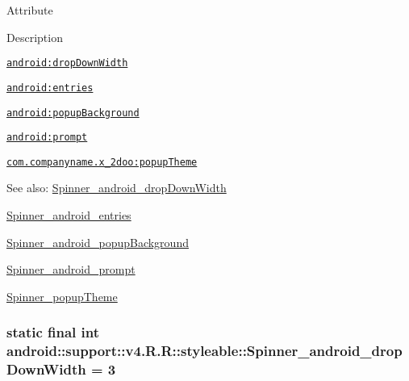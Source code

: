 Attribute

Description 

{\tt \hyperlink{classandroid_1_1support_1_1v4_1_1_r_1_1styleable_cbe49385f464cc4ae61e3598c9e2cfdc}{android:dropDownWidth}}

{\tt \hyperlink{classandroid_1_1support_1_1v4_1_1_r_1_1styleable_e1857fbb0172a2ba1e3b518c6dacac0d}{android:entries}}

{\tt \hyperlink{classandroid_1_1support_1_1v4_1_1_r_1_1styleable_101054d5ddcc269aa79631d35504d107}{android:popupBackground}}

{\tt \hyperlink{classandroid_1_1support_1_1v4_1_1_r_1_1styleable_66514c7282401aadd8fcf1b7cf06da7a}{android:prompt}}

{\tt \hyperlink{classandroid_1_1support_1_1v4_1_1_r_1_1styleable_b914ffabdea8381281dd34343fb1a5f1}{com.companyname.x\_\-2doo:popupTheme}}

\begin{Desc}
\item[See also:]\hyperlink{classandroid_1_1support_1_1v4_1_1_r_1_1styleable_cbe49385f464cc4ae61e3598c9e2cfdc}{Spinner\_\-android\_\-dropDownWidth} 

\hyperlink{classandroid_1_1support_1_1v4_1_1_r_1_1styleable_e1857fbb0172a2ba1e3b518c6dacac0d}{Spinner\_\-android\_\-entries} 

\hyperlink{classandroid_1_1support_1_1v4_1_1_r_1_1styleable_101054d5ddcc269aa79631d35504d107}{Spinner\_\-android\_\-popupBackground} 

\hyperlink{classandroid_1_1support_1_1v4_1_1_r_1_1styleable_66514c7282401aadd8fcf1b7cf06da7a}{Spinner\_\-android\_\-prompt} 

\hyperlink{classandroid_1_1support_1_1v4_1_1_r_1_1styleable_b914ffabdea8381281dd34343fb1a5f1}{Spinner\_\-popupTheme} \end{Desc}
\hypertarget{classandroid_1_1support_1_1v4_1_1_r_1_1styleable_cbe49385f464cc4ae61e3598c9e2cfdc}{
\subsubsection[{Spinner\_\-android\_\-dropDownWidth}]{\setlength{\rightskip}{0pt plus 5cm}static final int android::support::v4.R.R::styleable::Spinner\_\-android\_\-dropDownWidth = 3}}
\label{classandroid_1_1support_1_1v4_1_1_r_1_1styleable_cbe49385f464cc4ae61e3598c9e2cfdc}


